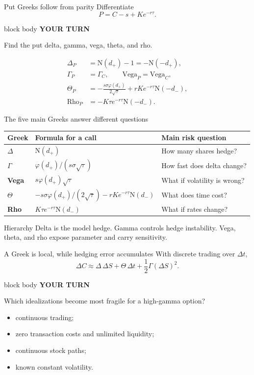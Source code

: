 \documentclass[handout,10pt,aspectratio=169]{beamer}
\newenvironment{pausebox}{%
  \begin{beamercolorbox}[rounded=true,sep=0.8em,wd=\textwidth]{block body}
  \textbf{\color{CourseGold}YOUR TURN}\quad
}{\end{beamercolorbox}}
\newcommand{\Ncdf}{\mathrm N}
\newcommand{\phiN}{\varphi}
\newcommand{\1}{\mathbf 1}
\begin{document}
\begin{frame}{Put Greeks follow from parity}
Differentiate
\[
P=C-s+Ke^{-r\tau}.
\]
\begin{pausebox}
Find the put delta, gamma, vega, theta, and rho.
\end{pausebox}

\[
\begin{aligned}
\Delta_P&=\Ncdf(d_+)-1=-\Ncdf(-d_+),\\
\Gamma_P&=\Gamma_C,\qquad \mathrm{Vega}_P=\mathrm{Vega}_C,\\
\Theta_P&=-\frac{s\sigma\phiN(d_+)}{2\sqrt{\tau}}
+rKe^{-r\tau}\Ncdf(-d_-),\\
\mathrm{Rho}_P&=-K\tau e^{-r\tau}\Ncdf(-d_-).
\end{aligned}
\]
\end{frame}

\begin{frame}{The five main Greeks answer different questions}
\small
\begin{tabular}{>{\bfseries}l l l}
\toprule
Greek & Formula for a call & Main risk question\\
\midrule
\(\Delta\) & \(\Ncdf(d_+)\) & How many shares hedge?\\
\(\Gamma\) & \(\phiN(d_+)/(s\sigma\sqrt{\tau})\) & How fast does delta change?\\
Vega & \(s\phiN(d_+)\sqrt{\tau}\) & What if volatility is wrong?\\
\(\Theta\) & \(-s\sigma\phiN(d_+)/(2\sqrt{\tau})-rKe^{-r\tau}\Ncdf(d_-)\) & What does time cost?\\
Rho & \(K\tau e^{-r\tau}\Ncdf(d_-)\) & What if rates change?\\
\bottomrule
\end{tabular}
\begin{block}{Hierarchy}
Delta is the model hedge. Gamma controls hedge instability. Vega, theta, and
rho expose parameter and carry sensitivity.
\end{block}
\end{frame}

\begin{frame}{A Greek is local, while hedging error accumulates}
With discrete trading over \(\Delta t\),
\[
\Delta C
\approx
\Delta\,\Delta S
+\Theta\,\Delta t
+\frac12\Gamma(\Delta S)^2.
\]
\begin{pausebox}
Which idealizations become most fragile for a high-gamma option?
\end{pausebox}

\begin{itemize}
  \item continuous trading;
  \item zero transaction costs and unlimited liquidity;
  \item continuous stock paths;
  \item known constant volatility.
\end{itemize}
\end{frame}
\end{document}
